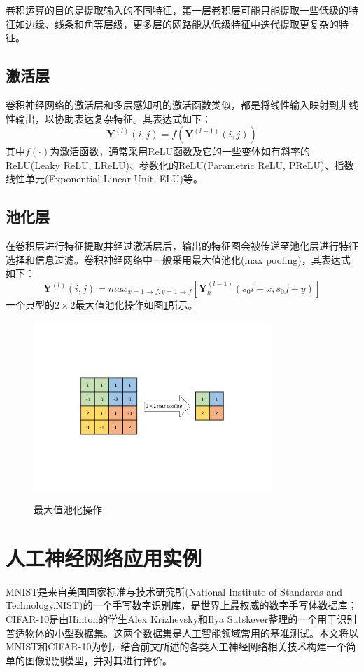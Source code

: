 \documentclass[a4paper]{ctexart}
\begin{document}
\begin{spacing}{1.3}
	卷积运算的目的是提取输入的不同特征，第一层卷积层可能只能提取一些低级的特征如边缘、线条和角等层级，更多层的网路能从低级特征中迭代提取更复杂的特征。
	
	\subsection{激活层}
	卷积神经网络的激活层和多层感知机的激活函数类似，都是将线性输入映射到非线性输出，以协助表达复杂特征。其表达式如下\cite{RN136}：
	\begin{equation}
		\bm Y^{(l)}(i,j)=f\left(\bm Y^{(l-1)}(i,j)\right)
	\end{equation}
	其中$f(\cdot)$为激活函数，通常采用ReLU函数及它的一些变体如有斜率的ReLU(Leaky ReLU, LReLU)、参数化的ReLU(Parametric ReLU, PReLU)、指数线性单元(Exponential Linear Unit, ELU)等。

	\subsection{池化层}
	在卷积层进行特征提取并经过激活层后，输出的特征图会被传递至池化层进行特征选择和信息过滤。卷积神经网络中一般采用最大值池化(max pooling)，其表达式如下：
	\begin{equation}
		\bm Y^{(l)}\left(i,j\right)=max_{x=1\rightarrow f,y=1\rightarrow f}\left[\bm Y_{k}^{(l-1)}(s_0i+x,s_0j+y)\right]
	\end{equation}
	一个典型的$2\times 2$最大值池化操作如图\ref{figure:最大值池化操作}所示。
	\begin{figure}[htbp]
		\centering
		\includegraphics[width=0.8\textwidth, keepaspectratio]{figure/pooling.pdf}\\
		\caption{最大值池化操作}\label{figure:最大值池化操作}
	\end{figure}

\section{人工神经网络应用实例}
MNIST是来自美国国家标准与技术研究所(National Institute of Standards and Technology,NIST)的一个手写数字识别库，是世界上最权威的数字手写体数据库；CIFAR-10是由Hinton的学生Alex Krizhevsky和Ilya Sutskever整理的一个用于识别普适物体的小型数据集。这两个数据集是人工智能领域常用的基准测试。本文将以MNIST和CIFAR-10为例，结合前文所述的各类人工神经网络相关技术构建一个简单的图像识别模型，并对其进行评价。


\end{spacing}
\end{document}
